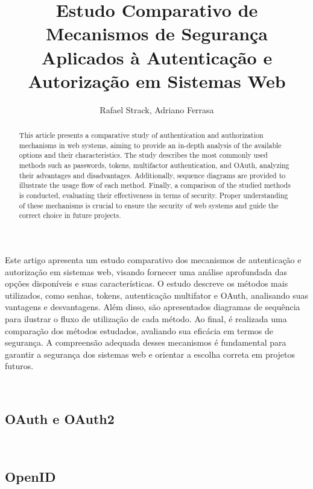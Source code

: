 \documentclass[12pt]{article}
\title{Estudo Comparativo de Mecanismos de Segurança Aplicados à Autenticação e Autorização em 
Sistemas Web}
\author{Rafael Strack\inst{1}, Adriano Ferrasa\inst{1}}
\begin{document}
\maketitle

\begin{abstract}
  This article presents a comparative study of authentication and authorization mechanisms in web
  systems, aiming to provide an in-depth analysis of the available options and their
  characteristics. The study describes the most commonly used methods such as passwords, tokens,
  multifactor authentication, and OAuth, analyzing their advantages and disadvantages. Additionally,
  sequence diagrams are provided to illustrate the usage flow of each method. Finally, a comparison
  of the studied methods is conducted, evaluating their effectiveness in terms of security. Proper
  understanding of these mechanisms is crucial to ensure the security of web systems and guide the
  correct choice in future projects.
\end{abstract}

\begin{resumo}
  Este artigo apresenta um estudo comparativo dos mecanismos de autenticação e autorização em
  sistemas web, visando fornecer uma análise aprofundada das opções disponíveis e suas
  características. O estudo descreve os métodos mais utilizados, como senhas, tokens, autenticação
  multifator e OAuth, analisando suas vantagens e desvantagens. Além disso, são apresentados
  diagramas de sequência para ilustrar o fluxo de utilização de cada método. Ao final, é
  realizada uma comparação dos métodos estudados, avaliando sua eficácia em termos de segurança. A
  compreensão adequada desses mecanismos é fundamental para garantir a segurança dos sistemas web e
  orientar a escolha correta em projetos futuros.
\end{resumo}












\
\subsection{OAuth e OAuth2}
\
\subsection{OpenID}
\

\
\end{document}

